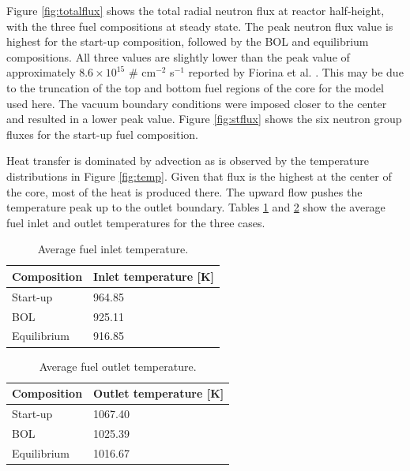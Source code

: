 \documentclass{anstrans}
\begin{document}
	Figure \ref{fig:totalflux} shows the total radial neutron flux at reactor
	half-height, with the three fuel compositions at steady state. 
	The peak neutron flux value is highest for the start-up composition,
	followed by the \gls{BOL} and equilibrium compositions. All three values
	are slightly lower than the peak value of approximately
	$8.6 \times 10^{15}$ \# cm$^{-2}$ s$^{-1}$ reported by Fiorina et al.
	\cite{fiorina_investigation_2013}. This may be due to the truncation of
	the top and bottom fuel regions of the core for the model used here.
	The vacuum boundary conditions were imposed closer to the center and
	resulted in a lower peak value. Figure \ref{fig:stflux} shows the six
	neutron group fluxes for the start-up fuel composition.
	
	Heat transfer is dominated by advection as is observed by the temperature
	distributions in Figure \ref{fig:temp}. Given that flux is the highest
	at the center of the core, most of the heat is produced there. The upward
	flow pushes the temperature peak up to the outlet boundary. Tables
	\ref{table:inlet} and \ref{table:outlet} show the average
	fuel inlet and outlet temperatures for the three cases.
%	
\begin{table}[H]
	\centering
	\captionsetup{justification=centering}
	\caption{Average fuel inlet temperature.}
	\begin{tabular}{ll}
		\hline
		{Composition} & {Inlet temperature [K]}\\
		\hline
		Start-up & 964.85\\
		\gls{BOL} & 925.11\\
		Equilibrium & 916.85\\
		\hline
	\end{tabular}
	\label{table:inlet}
\end{table}	
%
\begin{table}[H]
	\centering
	\captionsetup{justification=centering}
	\caption{Average fuel outlet temperature.}
	\begin{tabular}{ll}
		\hline
		{Composition} & {Outlet temperature [K]}\\
		\hline
		Start-up & 1067.40\\
		\gls{BOL} & 1025.39\\
		Equilibrium & 1016.67\\
		\hline
	\end{tabular}
	\label{table:outlet}
\end{table}	
\end{document}

